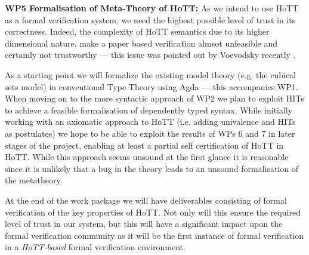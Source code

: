 \documentclass[a4paper,11pt]{article}
\begin{document}
{\bf WP5 Formalisation of Meta-Theory of HoTT:}  As we intend to use
HoTT as a formal verification system, we need the highest possible
level of trust in its correctness. Indeed, the complexity of HoTT
semantics due to its higher dimensional nature, make a paper based
verification almsot unfeasible and certainly not trustworthy --- this
issue was pointed out by Voevodsky recently \cite{voevodsky-ias14}.

As a starting point we will formalize the existing model theory
(e.g. the cubical sets model) in conventional Type Theory using Agda
--- this accompanies WP1. When moving on to the more syntactic
approach of WP2 we plan to exploit HITs to achieve a feasible
formalisation of dependently typed syntax. While initially working
with an axiomatic approach to HoTT (i.e. adding univalence and HITs as
postulates) we hope to be able to exploit the results of WPs 6 and 7
in later stages of the project, enabling at least a partial self
certification of HoTT in HoTT.  While this approach seems unsound at
the first glance it is reasonable since it is unlikely that a bug in
the theory leads to an unsound formalisation of the metatheory.

At the end of the work package we will have
deliverables consisting of formal verification of the key properties
of HoTT. Not only will this ensure the required level of trust in our
system, but this will have a significant impact upon the formal
verification community as it will be the first instance of formal
verification in a {\em HoTT-based} formal verification
environment.


\end{document}
